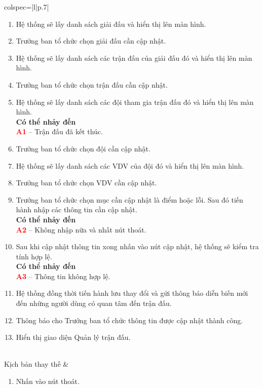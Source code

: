\begin{longtblr}[caption = {Đặc tả usecase Cập nhật diễn biến trận đấu},
  label = {tab:usecase1-spec},]{colspec={|l|p{.7\linewidth}|}}
\begin{minipage}{\linewidth}
\begin{enumerate}
      \item Hệ thống sẽ lấy danh sách giải đấu và hiển thị lên màn hình.
      \item Trưởng ban tổ chức chọn giải đấu cần cập nhật.
      \item Hệ thống sẽ lấy danh sách các trận đấu của giải đấu đó và hiển thị lên màn hình.
      \item Trưởng ban tổ chức chọn trận đấu cần cập nhật.
      \item Hệ thống sẽ lấy danh sách các đội tham gia trận đấu đó và hiển thị lên màn hình.\\
            \textbf{Có thể nhảy đến}\\
            \textbf{\textcolor{red}{A1}} -- Trận đấu đã kết thúc.
      \item Trưởng ban tổ chức chọn đội cần cập nhật.
      \item Hệ thống sẽ lấy danh sách các VDV của đội đó và hiển thị lên màn hình.
      \item Trưởng ban tổ chức chọn VDV cần cập nhật.
      \item Trưởng ban tổ chức chọn mục cần cập nhật là điểm hoặc lỗi. Sau đó tiến hành nhập các thông tin cần cập nhật.\\
            \textbf{Có thể nhảy đến}\\
            \textbf{\textcolor{red}{A2}} -- Không nhập nữa và nhất nút thoát.
      \item Sau khi cập nhật thông tin xong nhấn vào nút cập nhật, hệ thống sẽ kiểm tra tính hợp lệ.\\
            \textbf{Có thể nhảy đến}\\
            \textbf{\textcolor{red}{A3}} -- Thông tin không hợp lệ.
      \item Hệ thống đồng thời tiến hành lưu thay đổi và gửi thông báo diễn biến mới đến những người dùng có quan tâm đến trận đấu.
      \item Thông báo cho Trưởng ban tổ chức thông tin được cập nhật thành công.
      \item Hiển thị giao diện Quản lý trận đấu.
    \end{enumerate}
    \vskip 1pt
  \end{minipage}
  \\\hline
  Kịch bản thay thế    &
  \begin{minipage}{\linewidth}
    \vskip 4pt
    \begin{enumerate}[label={\textbf{\textcolor{red}{A\arabic*}} --}, align=left, itemsep=-5pt, start=2]
      \item  Nhấn vào nút thoát.  \\

\end{enumerate}
\end{minipage}
\end{longtblr}
